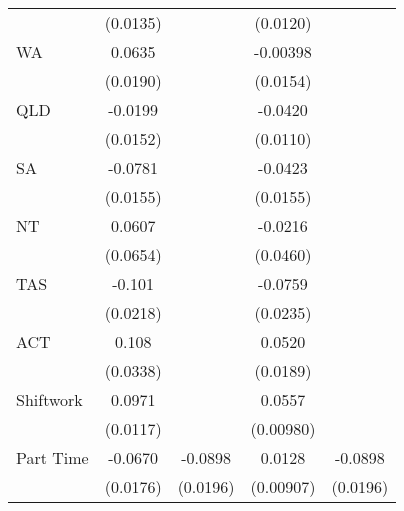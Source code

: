 {\begin{tabular}{l*{4}{c}}
                    &    (0.0135)         &                     &    (0.0120)         &                     \\
[1em]
WA                  &      0.0635\sym{***}&                     &    -0.00398         &                     \\
                    &    (0.0190)         &                     &    (0.0154)         &                     \\
[1em]
QLD                 &     -0.0199         &                     &     -0.0420\sym{***}&                     \\
                    &    (0.0152)         &                     &    (0.0110)         &                     \\
[1em]
SA                  &     -0.0781\sym{***}&                     &     -0.0423\sym{**} &                     \\
                    &    (0.0155)         &                     &    (0.0155)         &                     \\
[1em]
NT                  &      0.0607         &                     &     -0.0216         &                     \\
                    &    (0.0654)         &                     &    (0.0460)         &                     \\
[1em]
TAS                 &      -0.101\sym{***}&                     &     -0.0759\sym{**} &                     \\
                    &    (0.0218)         &                     &    (0.0235)         &                     \\
[1em]
ACT                 &       0.108\sym{**} &                     &      0.0520\sym{**} &                     \\
                    &    (0.0338)         &                     &    (0.0189)         &                     \\
[1em]
Shiftwork           &      0.0971\sym{***}&                     &      0.0557\sym{***}&                     \\
                    &    (0.0117)         &                     &   (0.00980)         &                     \\
[1em]
Part Time           &     -0.0670\sym{***}&     -0.0898\sym{***}&      0.0128         &     -0.0898\sym{***}\\
                    &    (0.0176)         &    (0.0196)         &   (0.00907)         &    (0.0196)         \\

\end{tabular}}
